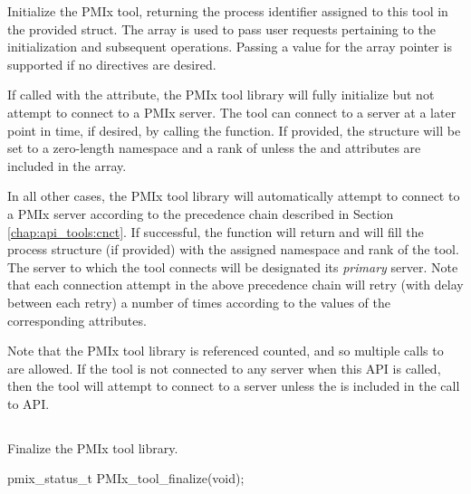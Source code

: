 \descr

Initialize the \ac{PMIx} tool, returning the process identifier assigned to this tool in the provided  struct. The  array is used to pass user requests pertaining to the initialization and subsequent operations. Passing a  value for the array pointer is supported if no directives are desired.

If called with the  attribute, the \ac{PMIx} tool library will fully initialize but not attempt to connect to a \ac{PMIx} server. The tool can connect to a server at a later point in time, if desired, by calling the  function. If provided, the  structure will be set to a zero-length namespace and a rank of  unless the  and  attributes are included in the  array.

In all other cases, the \ac{PMIx} tool library will automatically attempt to connect to a \ac{PMIx} server according to the precedence chain described in Section \ref{chap:api_tools:cnct}. If successful, the function will return  and will fill the process structure (if provided) with the assigned namespace and rank of the tool. The server to which the tool connects will be designated its \emph{primary} server. Note that each connection attempt in the above precedence chain will retry (with delay between each retry) a number of times according to the values of the corresponding attributes.

Note that the \ac{PMIx} tool library is referenced counted, and so multiple calls to  are allowed. If the tool is not connected to any server when this \ac{API} is called, then the tool will attempt to connect to a server unless the  is included in the call to \ac{API}.


\subsection{}

\summary

Finalize the \ac{PMIx} tool library.

\format

\cspecificstart
\begin{codepar}
pmix_status_t
PMIx_tool_finalize(void);
\end{codepar}
\cspecificend

